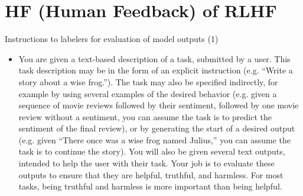 \documentclass[11pt,compress,t,notes=noshow, xcolor=table]{beamer}
\begin{document}











\section{HF (Human Feedback) of RLHF}








\begin{vbframe}{Instructions to labelers for evaluation of
	model outputs (1)}

	\begin{itemize}


\item You are given a text-based description of a task, submitted
by a user. This task description may be in the form of an
explicit instruction (e.g. “Write a story about a wise
frog.”). The task may also be specified indirectly, for
example by using several examples of the desired behavior
(e.g. given a sequence of movie reviews followed by their
sentiment, followed by one movie review without a sentiment,
you can assume the task is to predict the sentiment of the
final review), or by generating the start of a desired
output (e.g. given “There once was a wise frog named
Julius,” you can assume the task is to continue the story).
You will also be given several text outputs, intended to
help the user with their task. Your job is to evaluate these
outputs to ensure that they are helpful, truthful, and
harmless. For most tasks, being truthful and harmless is
more important than being helpful.



	\end{itemize}



\end{vbframe}
\end{document}
